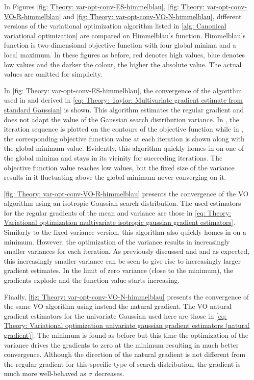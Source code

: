 In Figures \ref{fig: Theory: var-opt-conv-ES-himmelblau}, \ref{fig: Theory: var-opt-conv-VO-R-himmelblau} and \ref{fig: Theory: var-opt-conv-VO-N-himmelblau}, different versions of the variational optimization algorithm listed in \autoref{alg: Canonical variational optimization} are compared on Himmelblau's function. Himmelblau's function is two-dimensional objective function with four global minima and a local maximum. In these figures as before, red denotes high values, blue denotes low values and the darker the colour, the higher the absolute value. The actual values are omitted for simplicity.


In \autoref{fig: Theory: var-opt-conv-ES-himmelblau}, the convergence of the algorithm used in \cite{Salimans2017} and derived in \eqref{eq: Theory: Taylor: Multivariate gradient estimate from standard Gaussian} is shown. This algorithm estimates the regular gradient and does not adapt the value of the Gaussian search distribution variance. In , the iteration sequence is plotted on the contours of the objective function while in , the corresponding objective function value at each iteration is shown along with the global minimum value. Evidently, this algorithm quickly homes in on one of the global minima and stays in its vicinity for succeeding iterations. The objective function value reaches low values, but the fixed size of the variance results in it fluctuating above the global minimum never converging on it.

\autoref{fig: Theory: var-opt-conv-VO-R-himmelblau} presents the convergence of the \gls{VO} algorithm using an isotropic Gaussian search distribution. The used estimators for the regular gradients of the mean and variance are those in \eqref{eq: Theory: Variational optimization multivariate isotropic gaussian gradient estimators}. Similarly to the fixed variance version, this algorithm also quickly homes in on a minimum. However, the optimization of the variance results in increasingly smaller variances for each iteration. As previously discussed and and as expected, this increasingly smaller variance can be seen to give rise to increasingly larger gradient estimates. In the limit of zero variance (close to the minimum), the gradients explode and the function value starts increasing.

Finally, \autoref{fig: Theory: var-opt-conv-VO-N-himmelblau} presents the convergence of the same \gls{VO} algorithm using instead the natural gradient. The \gls{VO} natural gradient estimators for the univariate Gaussian used here are those in \eqref{eq: Theory: Variational optimization univariate gaussian gradient estimators (natural gradient)}. The minimum is found as before but this time the optimization of the variance drives the gradients to zero at the minimum resulting in much better convergence. Although the direction of the natural gradient is not different from the regular gradient for this specific type of search distribution, the gradient is much more well-behaved as $\sigma$ decreases.

